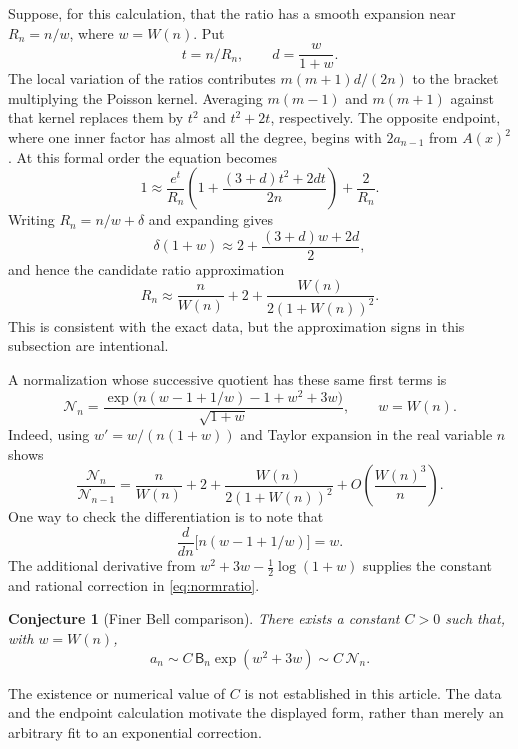 \documentclass[11pt]{article}
\numberwithin{equation}{section}
\newtheorem{conjecture}[theorem]{Conjecture}
\theoremstyle{definition}
\theoremstyle{remark}
\begin{document}
Suppose, for this calculation, that the ratio has a smooth expansion
near $R_n=n/w$, where $w=W(n)$. Put
\[
 t=n/R_n,\qquad d=\frac{w}{1+w}.
\]
The local variation of the ratios contributes
$m(m+1)d/(2n)$ to the bracket multiplying the Poisson kernel. Averaging
$m(m-1)$ and $m(m+1)$ against that kernel replaces them by $t^2$ and
$t^2+2t$, respectively. The opposite endpoint, where one inner factor
has almost all the degree, begins with $2a_{n-1}$ from $A(x)^2$.
At this formal order the equation becomes
\begin{equation}\label{eq:formalbalance}
 1\approx\frac{e^t}{R_n}
  \left(1+\frac{(3+d)t^2+2dt}{2n}\right)+\frac2{R_n}.
\end{equation}
Writing $R_n=n/w+\delta$ and expanding gives
\[
 \delta(1+w)\approx2+\frac{(3+d)w+2d}{2},
\]
and hence the candidate ratio approximation
\begin{equation}\label{eq:ratiocandidate}
 R_n\approx\frac n{W(n)}+2+
                \frac{W(n)}{2(1+W(n))^2}.
\end{equation}
This is consistent with the exact data, but the approximation signs in
this subsection are intentional.

A normalization whose successive quotient has these same first terms
is
\begin{equation}\label{eq:normalizer}
 \mathcal N_n=
 \frac{\exp\!\bigl(n(w-1+1/w)-1+w^2+3w\bigr)}{\sqrt{1+w}},
 \qquad w=W(n).
\end{equation}
Indeed, using $w'=w/(n(1+w))$ and Taylor expansion in the real variable
$n$ shows
\begin{equation}\label{eq:normratio}
 \frac{\mathcal N_n}{\mathcal N_{n-1}}
 =\frac n{W(n)}+2+
     \frac{W(n)}{2(1+W(n))^2}
      +O\!\left(\frac{W(n)^3}{n}\right).
\end{equation}
One way to check the differentiation is to note that
\[
 \frac d{dn}\bigl[n(w-1+1/w)\bigr]=w.
\]
The additional derivative from $w^2+3w-\tfrac12\log(1+w)$ supplies the
constant and rational correction in \eqref{eq:normratio}.

\begin{conjecture}[Finer Bell comparison]\label{conj:finer}
There exists a constant $C>0$ such that, with $w=W(n)$,
\begin{equation}\label{eq:conjecture}
 a_n\sim C\,\mathsf B_n\exp(w^2+3w)
       \sim C\,\mathcal N_n.
\end{equation}
\end{conjecture}
The existence or numerical value of $C$ is not established in this
article. The data and the endpoint calculation motivate the displayed
form, rather than merely an arbitrary fit to an exponential correction.
\end{document}
